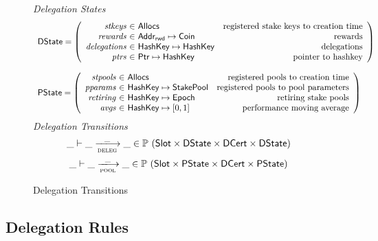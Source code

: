 \begin{figure}
  \emph{Delegation States}
  \begin{equation*}
    \begin{array}{l}
    \DState =
    \left(\begin{array}{r@{~\in~}lr}
      \var{stkeys} & \Allocs & \text{registered stake keys to creation time}\\
      \var{rewards} & \AddrRWD \mapsto \Coin & \text{rewards}\\
      \var{delegations} & \HashKey \mapsto \HashKey & \text{delegations}\\
      \var{ptrs} & \Ptr \mapsto \HashKey & \text{pointer to hashkey}\\
    \end{array}\right)
    \\
    \\
    \PState =
    \left(\begin{array}{r@{~\in~}lr}
      \var{stpools} & \Allocs & \text{registered pools to creation time}\\
      \var{pparams} & \HashKey \mapsto \StakePool
        & \text{registered pools to pool parameters}\\
      \var{retiring} & \HashKey \mapsto \Epoch & \text{retiring stake pools}\\
      \var{avgs} & \HashKey \mapsto [0, 1] & \text{performance moving average}\\
    \end{array}\right)
    \end{array}
  \end{equation*}
  \emph{Delegation Transitions}
  \begin{equation*}
    \_ \vdash \_ \trans{deleg}{\_} \_ \in
      \powerset (\Slot \times \DState \times \DCert \times \DState)
  \end{equation*}
  \begin{equation*}
    \_ \vdash \_ \trans{pool}{\_} \_ \in
      \powerset (\Slot \times \PState \times \DCert \times \PState)
  \end{equation*}
  \caption{Delegation Transitions}
  \label{fig:delegation-transitions}
\end{figure}

\clearpage

\subsection{Delegation Rules}
\label{sec:deleg-rules}


